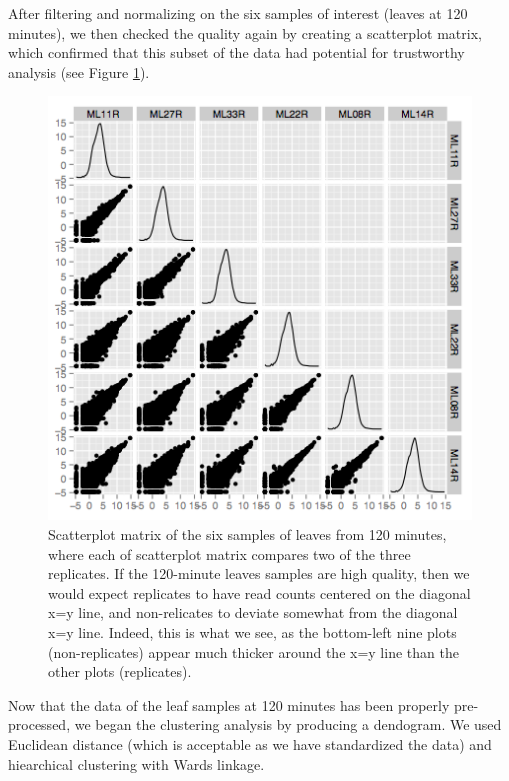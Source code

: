 \documentclass[11pt,a4paper,oldfontcommands,openany]{memoir}
\numberwithin{equation}{section} %
\begin{document}
After filtering and normalizing on the six samples of interest (leaves at 120 minutes), we then checked the quality again by creating a scatterplot matrix, which confirmed that this subset of the data had potential for trustworthy analysis (see Figure \ref{fig:L120scatter}).

\begin{figure}[H]
    \begin{framed}
    \centering
    \includegraphics[width=\textwidth]{L120scatter}
    \end{framed}
    \caption{Scatterplot matrix of the six samples of leaves from 120 minutes, where each of scatterplot matrix compares two of the three replicates. If the 120-minute leaves samples are high quality, then we would expect replicates to have read counts centered on the diagonal x=y line, and non-relicates to deviate somewhat from the diagonal x=y line. Indeed, this is what we see, as the bottom-left nine plots (non-replicates) appear much thicker around the x=y line than the other plots (replicates).}
    \label{fig:L120scatter}
\end{figure}

Now that the data of the leaf samples at 120 minutes has been properly pre-processed, we began the clustering analysis by producing a dendogram. We used Euclidean distance (which is acceptable as we have standardized the data) and hiearchical clustering with Wards linkage.
\end{document}
